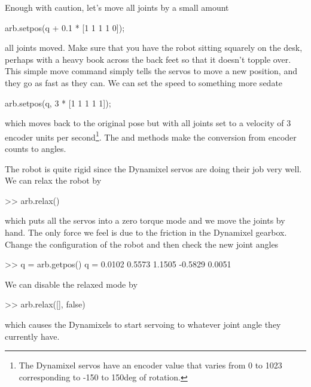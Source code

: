 \documentclass[11pt]{article}
\begin{document}
Enough with caution, let's move all joints by a small amount
\begin{Code}
arb.setpos(q + 0.1 * [1 1 1 1 0]);
\end{Code}
all joints moved.
Make sure that you have the robot sitting squarely on the desk, perhaps with a heavy book across the back feet so
that it doesn't topple over.
This simple move command simply tells the servos to move a new position, and they go as fast as they can.
We can set the speed to something more sedate
\begin{Code}
arb.setpos(q, 3 * [1 1 1 1 1]);
\end{Code}
which moves back to the original pose but with all joints set to a velocity of 3 encoder units per second\footnote{The Dynamixel servos have an encoder value that varies from 0 to 1023 corresponding to -150 to 150\unit{deg} of rotation.}.
The  and  methods make the conversion from encoder counts to angles.

The robot is quite rigid since the Dynamixel servos are doing their job very well.  We can relax the robot by
\begin{Code}
>> arb.relax()
\end{Code}
which puts all the servos into a zero torque mode and we move the joints by hand.  The only force we feel is due to 
the friction in the Dynamixel gearbox.
Change the configuration of the robot and then check the new joint angles
\begin{Code}
>> q = arb.getpos()
q =
    0.0102    0.5573    1.1505   -0.5829    0.0051
\end{Code}
We can disable the relaxed mode by
\begin{Code}
>> arb.relax([], false)
\end{Code}
which causes the Dynamixels to start servoing to whatever joint angle they currently have.
\end{document}
